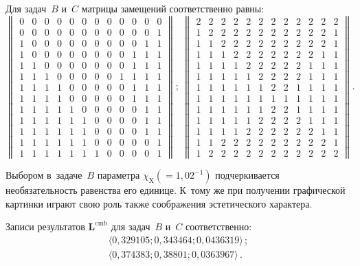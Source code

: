 \begin{multicols}{2}
  Для задач~$B$ и~$C$ матрицы замещений соответственно равны: 
  $$
  \left\|
  \begin{array}{cccccccccccc}
0&0&0&0&0&0&0&0&0&0&0&0\\
0&0&0&0&0&0&0&0&0&0&0&1\\
1&0&0&0&0&0&0&0&0&0&1&1\\
1&0&0&0&0&0&0&0&0&1&1&1\\
1&1&0&0&0&0&0&0&0&1&1&1\\
1&1&1&0&0&0&0&0&1&1&1&1\\
1&1&1&1&0&0&0&0&0&1&1&1\\
1&1&1&1&0&0&0&0&0&1&1&1\\
1&1&1&1&1&0&0&0&0&0&1&1\\
1&1&1&1&1&1&0&0&0&0&1&1\\
1&1&1&1&1&1&0&0&0&0&1&1\\
1&1&1&1&1&1&0&0&0&0&0&1\\
1&1&1&1&1&1&1&0&0&0&0&1
\end{array}
\right\|; \ 
\left\|
\begin{array}{cccccccccccc}
2&2&2&2&2&2&2&2&2&2&2&2\\
1&2&2&2&2&2&2&2&2&2&2&1\\
1&1&2&2&2&2&2&2&2&2&2&1\\
1&1&1&2&2&2&2&2&2&2&1&1\\
1&1&1&1&2&2&2&2&2&1&1&1\\
1&1&1&1&1&2&2&2&2&1&1&1\\
1&1&1&1&1&1&2&2&1&1&1&1\\
1&1&1&1&1&1&1&1&1&1&1&1\\
1&1&1&1&1&1&2&2&1&1&1&1\\
1&1&1&1&1&2&2&2&2&1&1&1\\
1&1&1&1&2&2&2&2&2&2&1&1\\
1&1&2&2&2&2&2&2&2&2&2&1\\
1&2&2&2&2&2&2&2&2&2&2&2
\end{array}
\right\|.
$$
  
  Выбором в~задаче~$B$ параметра $\chi_{\mathrm{X}} (= 1{,}02^{-1})$ 
подчеркивается необязательность равенства его единице. К~тому же при 
получении графической картинки играют свою роль также соображения 
эстетического характера. 
  
  Записи результатов $\boldsymbol{L}^{\mathrm{cmb}}$ для задач~$B$ и~$C$ 
соответственно: 
 \begin{gather*}
  \langle 0{,}329105; 0{,}343464; 0{,}0436319\rangle\,;\\
  \langle 
0{,}374383; 0{,}38801; 0{,}0363967\rangle\,. 
  \end{gather*}
  

\end{multicols}
